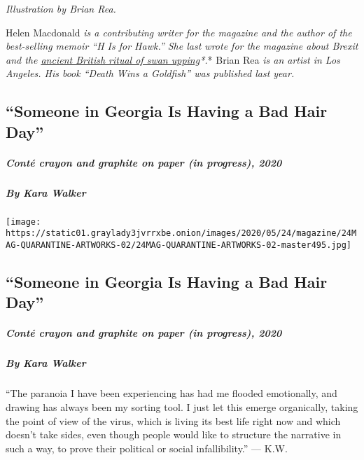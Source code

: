 \emph{Illustration by Brian Rea.}

Helen Macdonald \emph{\emph{is a contributing writer for the magazine
and the author of the best-selling memoir ``H Is for Hawk.'' She last
wrote for the magazine about Brexit and the}
\href{https://www.nytimes3xbfgragh.onion/2017/01/05/magazine/in-search-of-post-brexit-england-and-swans.html}{ancient
British ritual of swan upping}*.}* Brian Rea \emph{is an artist in Los
Angeles. His book ``Death Wins a Goldfish'' was published last year.}

\hypertarget{someone-in-georgia-is-having-a-bad-hair-day-2}{%
\subsection{``Someone in Georgia Is Having a Bad Hair
Day''}\label{someone-in-georgia-is-having-a-bad-hair-day-2}}

\hypertarget{contuxe9-crayon-and-graphite-on-paper-in-progress-2020-2}{%
\subparagraph{Conté crayon and graphite on paper (in progress),
2020}\label{contuxe9-crayon-and-graphite-on-paper-in-progress-2020-2}}

\hypertarget{by-kara-walker-2}{%
\subparagraph{By Kara Walker}\label{by-kara-walker-2}}

\texttt{[image: https://static01.graylady3jvrrxbe.onion/images/2020/05/24/magazine/24MAG-QUARANTINE-ARTWORKS-02/24MAG-QUARANTINE-ARTWORKS-02-master495.jpg]}

\hypertarget{someone-in-georgia-is-having-a-bad-hair-day-3}{%
\subsection{``Someone in Georgia Is Having a Bad Hair
Day''}\label{someone-in-georgia-is-having-a-bad-hair-day-3}}

\hypertarget{contuxe9-crayon-and-graphite-on-paper-in-progress-2020-3}{%
\subparagraph{Conté crayon and graphite on paper (in progress),
2020}\label{contuxe9-crayon-and-graphite-on-paper-in-progress-2020-3}}

\hypertarget{by-kara-walker-3}{%
\subparagraph{By Kara Walker}\label{by-kara-walker-3}}

``The paranoia I have been experiencing has had me flooded emotionally,
and drawing has always been my sorting tool. I just let this emerge
organically, taking the point of view of the virus, which is living its
best life right now and which doesn't take sides, even though people
would like to structure the narrative in such a way, to prove their
political or social infallibility.'' --- K.W.

